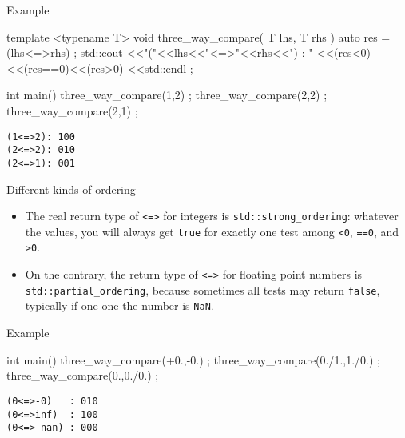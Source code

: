 \begin{frame}[fragile]
  \scriptsize
  \begin{exampleblock}{Example}
    \begin{cppcode*}{}
    template <typename T>
    void three_way_compare( T lhs, T rhs )
    {
      auto res = (lhs<=>rhs) ;
      std::cout
        <<"("<<lhs<<"<=>"<<rhs<<") : "
        <<(res<0)<<(res==0)<<(res>0)
        <<std::endl ;
    }

    int main()
    {
      three_way_compare(1,2) ;
      three_way_compare(2,2) ;
      three_way_compare(2,1) ;
    }
    \end{cppcode*}
  \end{exampleblock}
  \begin{Verbatim}
(1<=>2): 100
(2<=>2): 010
(2<=>1): 001
  \end{Verbatim}
\end{frame}

\begin{frame}[fragile]
  \begin{block}{Different kinds of ordering}
    \begin{itemize}
    \item The real return type of \texttt{<=>} for integers is \texttt{std::strong_ordering}: whatever the values, you will always get \texttt{true} for exactly one test among \texttt{<0}, \texttt{==0}, and \texttt{>0}.
    \item On the contrary, the return type of \texttt{<=>} for floating point numbers is \texttt{std::partial_ordering}, because sometimes all tests may return \texttt{false}, typically if one one the number is \texttt{NaN}.
    \end{itemize}
  \end{block}
\end{frame}

\begin{frame}[fragile]
  \scriptsize
  \begin{exampleblock}{Example}
    \begin{cppcode*}{}
    int main()
    {
      three_way_compare(+0.,-0.) ;
      three_way_compare(0./1.,1./0.) ;
      three_way_compare(0.,0./0.) ;
    }
    \end{cppcode*}
  \end{exampleblock}
  \begin{Verbatim}
(0<=>-0)   : 010
(0<=>inf)  : 100
(0<=>-nan) : 000
  \end{Verbatim}
\end{frame}

